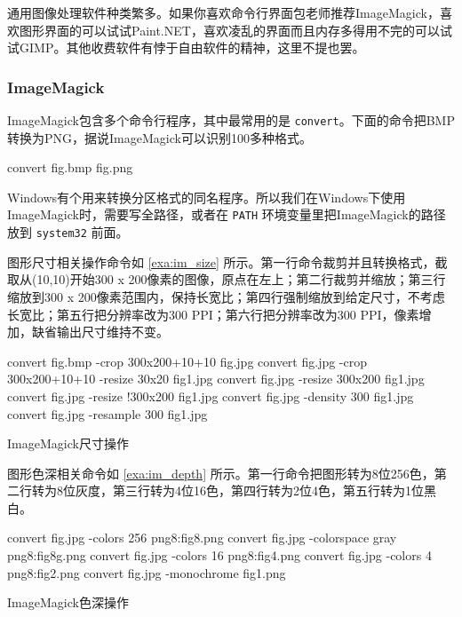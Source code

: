 通用图像处理软件种类繁多。如果你喜欢命令行界面包老师推荐ImageMagick，喜欢图形界面的可以试试Paint.NET，喜欢凌乱的界面而且内存多得用不完的可以试试GIMP。其他收费软件有悖于自由软件的精神，这里不提也罢。

\subsubsection{ImageMagick}

ImageMagick包含多个命令行程序，其中最常用的是 \texttt{convert}。下面的命令把BMP转换为PNG，据说ImageMagick可以识别100多种格式。

\begin{Code}[]
convert fig.bmp fig.png 
\end{Code}

Windows有个用来转换分区格式的同名程序。所以我们在Windows下使用ImageMagick时，需要写全路径，或者在 \texttt{PATH} 环境变量里把ImageMagick的路径放到 \texttt{system32} 前面。

图形尺寸相关操作命令如 \autoref{exa:im_size} 所示。第一行命令裁剪并且转换格式，截取从(10,10)开始300 x 200像素的图像，原点在左上；第二行裁剪并缩放；第三行缩放到300 x 200像素范围内，保持长宽比；第四行强制缩放到给定尺寸，不考虑长宽比；第五行把分辨率改为300 PPI；第六行把分辨率改为300 PPI，像素增加，缺省输出尺寸维持不变。

\begin{example}[h]
\begin{Code}[numbers=left]
convert fig.bmp -crop 300x200+10+10 fig.jpg
convert fig.jpg -crop 300x200+10+10 -resize 30x20 fig1.jpg
convert fig.jpg -resize 300x200 fig1.jpg
convert fig.jpg -resize !300x200 fig1.jpg
convert fig.jpg -density 300 fig1.jpg
convert fig.jpg -resample 300 fig1.jpg
\end{Code}
\caption{ImageMagick尺寸操作}
\label{exa:im_size}
\end{example}

图形色深相关命令如 \autoref{exa:im_depth} 所示。第一行命令把图形转为8位256色，第二行转为8位灰度，第三行转为4位16色，第四行转为2位4色，第五行转为1位黑白。

\begin{example}[h]
\begin{Code}[numbers=left]
convert fig.jpg -colors 256 png8:fig8.png
convert fig.jpg -colorspace gray png8:fig8g.png
convert fig.jpg -colors 16 png8:fig4.png
convert fig.jpg -colors 4 png8:fig2.png
convert fig.jpg -monochrome fig1.png
\end{Code}
\caption{ImageMagick色深操作}
\label{exa:im_depth}
\end{example}

